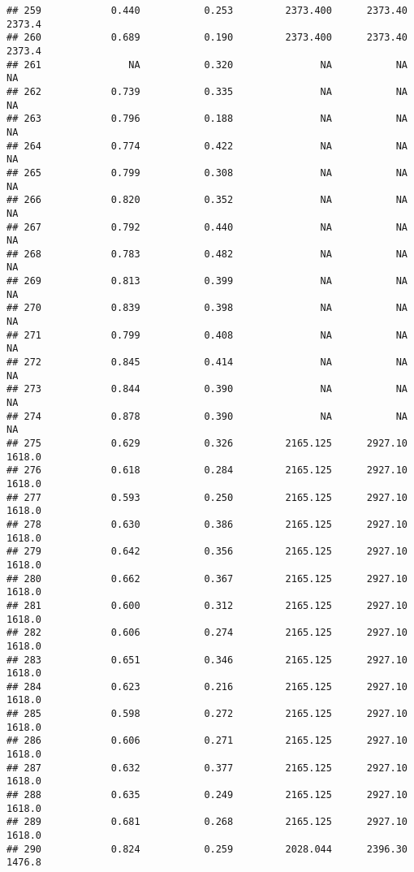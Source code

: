 \documentclass[
]{article}
\begin{document}
\begin{verbatim}
## 259            0.440           0.253         2373.400      2373.40       2373.4
## 260            0.689           0.190         2373.400      2373.40       2373.4
## 261               NA           0.320               NA           NA           NA
## 262            0.739           0.335               NA           NA           NA
## 263            0.796           0.188               NA           NA           NA
## 264            0.774           0.422               NA           NA           NA
## 265            0.799           0.308               NA           NA           NA
## 266            0.820           0.352               NA           NA           NA
## 267            0.792           0.440               NA           NA           NA
## 268            0.783           0.482               NA           NA           NA
## 269            0.813           0.399               NA           NA           NA
## 270            0.839           0.398               NA           NA           NA
## 271            0.799           0.408               NA           NA           NA
## 272            0.845           0.414               NA           NA           NA
## 273            0.844           0.390               NA           NA           NA
## 274            0.878           0.390               NA           NA           NA
## 275            0.629           0.326         2165.125      2927.10       1618.0
## 276            0.618           0.284         2165.125      2927.10       1618.0
## 277            0.593           0.250         2165.125      2927.10       1618.0
## 278            0.630           0.386         2165.125      2927.10       1618.0
## 279            0.642           0.356         2165.125      2927.10       1618.0
## 280            0.662           0.367         2165.125      2927.10       1618.0
## 281            0.600           0.312         2165.125      2927.10       1618.0
## 282            0.606           0.274         2165.125      2927.10       1618.0
## 283            0.651           0.346         2165.125      2927.10       1618.0
## 284            0.623           0.216         2165.125      2927.10       1618.0
## 285            0.598           0.272         2165.125      2927.10       1618.0
## 286            0.606           0.271         2165.125      2927.10       1618.0
## 287            0.632           0.377         2165.125      2927.10       1618.0
## 288            0.635           0.249         2165.125      2927.10       1618.0
## 289            0.681           0.268         2165.125      2927.10       1618.0
## 290            0.824           0.259         2028.044      2396.30       1476.8

\end{verbatim}
\end{document}
